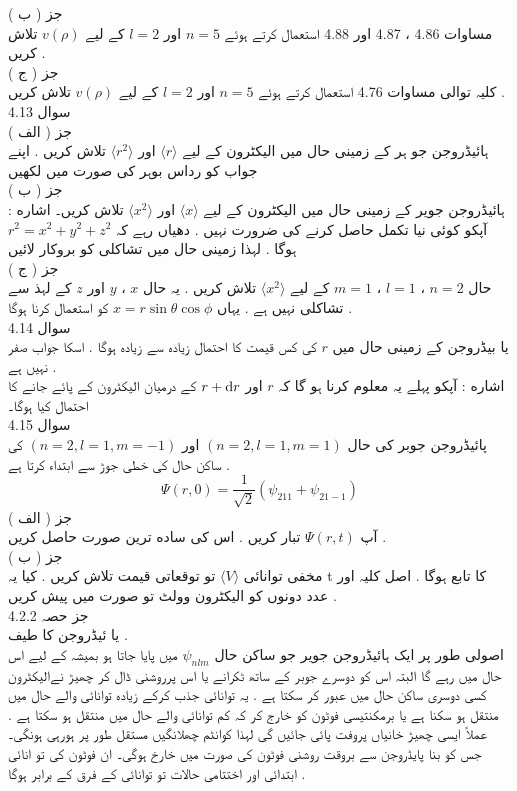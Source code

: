 \documentclass{book}
\begin{document}
جز ( ب )\\
مساوات 4.86 ، 4.87 اور 4.88 استعمال کرتے ہوئے
\(n=5\)
اور 
\(l=2\)
کے لیے 
\(v(\rho)\)
تلاش کریں .\\
جز ( ج )\\
کلیہ توالی مساوات 4.76 استعمال کرتے ہوئے
\(n=5\)
اور
\(l=2\)
کے لیے
\(v(\rho)\)
تلاش کریں .\\
سوال 
4.13\\
جز ( الف )\\
ہائیڈروجن جو ہر کے زمینی حال میں الیکٹرون   کے لیے
\(\langle r \rangle\)
اور
\(\langle r^{2} \rangle\)
تلاش کریں . اپنے جواب کو رداس بوہر کی صورت میں لکھیں \\
جز ( ب )\\
ہائیڈروجن جویر کے زمینی حال میں الیکٹرون  کے لیے
\(\langle x \rangle\)
اور
\(\langle x^{2} \rangle\)
تلاش کریں۔ اشاره : آپکو کوئی نیا تکمل حاصل کرنے کی ضرورت نہیں . دھیاں رہے کہ
\(r^{2}=x^{2}+y^{2}+z^{2}\)
ہوگا . لہذا زمینی حال میں تشاکلی کو بروکار لائیں \\
جز ( ج )\\
حال
\(n=2\)
،
\(l=1\)
،
\(m=1\)
کے لیے 
\(\langle x^{2} \rangle\)
تلاش کریں . یہ حال
\(x\)
،
\(y\)
اور
\(z\)
کے لہذ سے تشاکلی نہیں ہے . یہاں
\(x=r\sin{\theta}\cos{\phi}\)
کو
استعمال کرنا ہوگا .\\
سوال 
4.14\\
یا بیڈروجن کے زمینی حال میں
\(r\)
کی کس قیمت کا احتمال زیادہ سے زیادہ ہوگا . اسکا جواب صفر نہیں ہے .\\
اشاره : آپکو پہلے یہ معلوم کرنا ہو گا کہ
\(r\)
اور
\(r+\dif{r}\)
کے درمیان الیکٹرون کے پائے جانے کا احتمال کیا ہوگا۔\\
سوال 
4.15\\
پائیڈروجن جوبر کی حال
\((n=2,l=1,m=1)\)
اور
\((n=2,l=1,m=-1)\)
کی ساکن حال کی خطی جوڑ سے ابتداء کرتا ہے .\\
\[\Psi(r,0)=\frac{1}{\sqrt{2}}(\psi_{211}+\psi_{21-1})\]
جز ( الف )\\
آپ
\(\Psi(r,t)\)
تبار کریں . اس کی ساده ترین صورت حاصل کریں .\\
جز ( ب )\\
مخفی توانائی 
\(\langle V \rangle\)
تو توقعاتی قیمت تلاش کریں . کیا یہ
t
کا تابع ہوگا . اصل کلیہ اور عدد دونوں کو الیکٹرون وولٹ تو صورت میں پیش کریں .\\
جز حصہ 
4.2.2\\
يا ئیڈروجن کا طيف .\\
اصولی طور پر ایک ہائیڈروجن جویر جو ساکن حال
\(\psi_{nlm}\)
میں پایا جاتا ہو بمیشہ کے لیے اس حال میں رہے گا البتہ اس کو دوسرے جوبر کے ساتھ ٹکرانے یا اس پرروشنی ڈال کر چھیڑ نےالیکٹرون کسی دوسری ساکن حال میں عبور کر سکتا ہے . یہ توانائی جذب کرکے زیادہ توانائی والے حال میں منتقل ہو سکنا ہے یا برمکنتیسی فوٹون کو خارج کر کہ کم توانائی والے حال میں منتقل ہو سکتا ہے . عملاً ایسی چھیڑ خانیاں پروفت پائی جائیں گی لہذا کوانٹم چھلانگیں مستقل طور پر ہورہی ہونگی۔ جس کو بنا پایڈروجن سے بروقت روشنی فوٹون کی صورت میں خارخ ہوگی۔ ان فوٹون کی تو انائی ابتدائی اور اختتامی حالات تو توانائی کے فرق کے برابر ہوگا .\\
\end{document}
